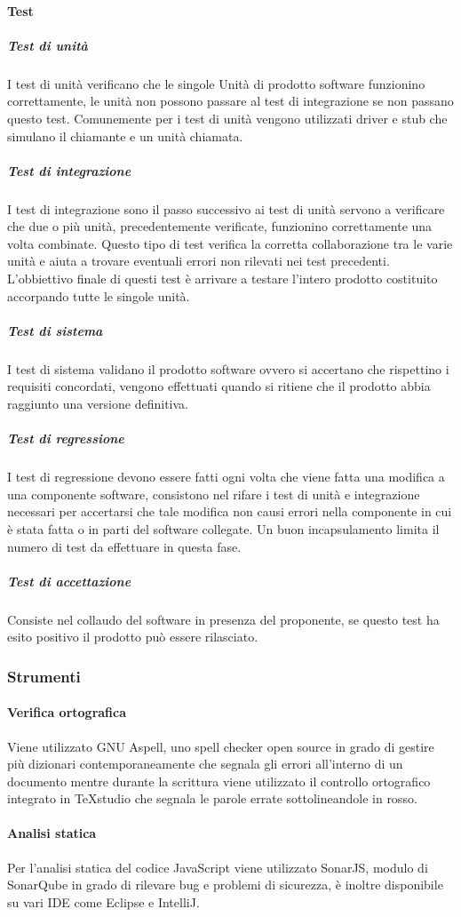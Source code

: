 		\paragraph{Test}
			\subparagraph{Test di unità} \Spazio
			I test di unità verificano che le singole Unità di prodotto software funzionino correttamente, le unità non possono passare al test di integrazione se non passano questo test.
			Comunemente per i test di unità vengono utilizzati driver e stub che simulano il chiamante e un unità chiamata.
			\subparagraph{Test di integrazione} \Spazio
			I test di integrazione sono il passo successivo ai test di unità servono a verificare che due o più unità, precedentemente verificate, funzionino correttamente una volta combinate.
			Questo tipo di test verifica la corretta collaborazione tra le varie unità e aiuta a trovare eventuali errori non rilevati nei test precedenti.
			L'obbiettivo finale di questi test è arrivare a testare l'intero prodotto costituito accorpando tutte le singole unità.
			\subparagraph{Test di sistema} \Spazio
			I test di sistema validano il prodotto software ovvero si accertano che rispettino i requisiti concordati, vengono effettuati quando si ritiene che il prodotto abbia raggiunto una versione definitiva.
			\subparagraph{Test di regressione}	\Spazio
			I test di regressione devono essere fatti ogni volta che viene fatta una modifica a una componente software, consistono nel rifare i test di unità e integrazione necessari per accertarsi che tale modifica non causi errori nella componente in cui è stata fatta o in parti del software collegate.
			Un buon incapsulamento limita il numero di test da effettuare in questa fase.				
			\subparagraph{Test di accettazione} \Spazio
			Consiste nel collaudo del software in presenza del proponente, se questo test ha esito positivo il prodotto può essere rilasciato.
	\subsubsection{Strumenti}
			\paragraph{Verifica ortografica} \Spazio
			Viene utilizzato GNU Aspell, uno spell checker open source in grado di gestire più dizionari contemporaneamente che segnala gli errori all'interno di un documento mentre durante la scrittura viene utilizzato il controllo ortografico integrato in TeXstudio che segnala le parole errate sottolineandole in rosso.
			\paragraph{Analisi statica} \Spazio
			Per l'analisi statica del codice JavaScript viene utilizzato SonarJS, modulo di SonarQube in grado di rilevare bug e problemi di sicurezza, è inoltre disponibile su vari IDE come Eclipse e IntelliJ.
